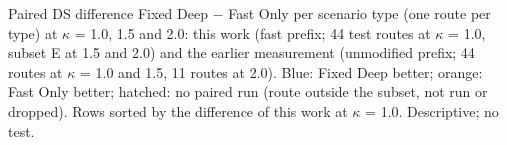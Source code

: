 \caption{Paired DS difference Fixed Deep $-$ Fast Only per scenario type (one route per type) at $\kappa$ = 1.0, 1.5 and 2.0: this work (fast prefix; 44 test routes at $\kappa$ = 1.0, subset E at 1.5 and 2.0) and the earlier measurement (unmodified prefix; 44 routes at $\kappa$ = 1.0 and 1.5, 11 routes at 2.0). Blue: Fixed Deep better; orange: Fast Only better; hatched: no paired run (route outside the subset, not run or dropped). Rows sorted by the difference of this work at $\kappa$ = 1.0. Descriptive; no test.}%
\label{fig:fig1_scenarios}%
